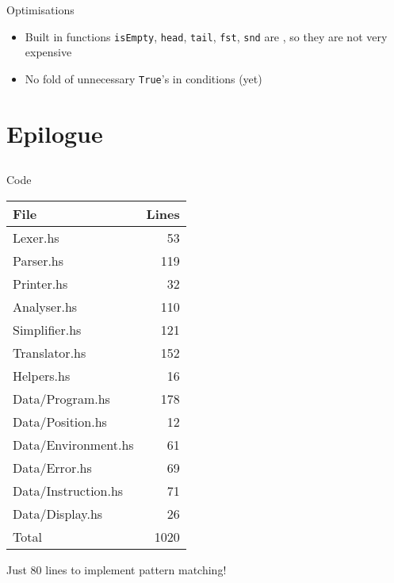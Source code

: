 \begin{frame}{Optimisations}

  \begin{itemize}
    \item Built in functions \texttt{isEmpty}, \texttt{head}, \texttt{tail}, \texttt{fst}, \texttt{snd} are , so they are not very expensive
    \item No fold of unnecessary \texttt{True}'s in conditions (yet)
  \end{itemize}

\end{frame}

\section{Epilogue}
\subsection*{}

\begin{frame}{Code}

  \begin{twocolumns}
    \begin{table}
      \footnotesize
      \begin{tabular}{lr}
        \hline
        File                & Lines \\
        \hline
        Lexer.hs            &   53  \\
        Parser.hs           &  119  \\
        Printer.hs          &   32  \\
        Analyser.hs         &  110  \\
        Simplifier.hs       &  121  \\
        Translator.hs       &  152  \\
        Helpers.hs          &   16  \\
        Data/Program.hs     &  178  \\
        Data/Position.hs    &   12  \\
        Data/Environment.hs &   61  \\
        Data/Error.hs       &   69  \\
        Data/Instruction.hs &   71  \\
        Data/Display.hs     &   26  \\
        \hline
        Total               & 1020  \\
        \end{tabular}
    \end{table}
    \nextcolumn
    Just 80 lines to implement pattern matching!
  \end{twocolumns}

\end{frame}

